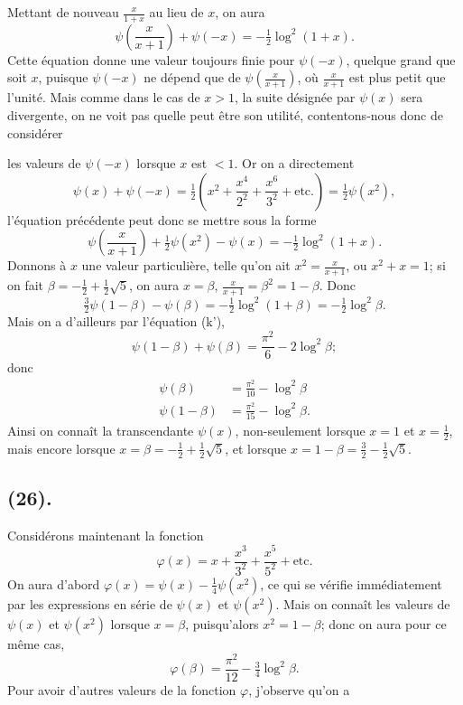 \documentclass{article}
\begin{document}
Mettant de nouveau $\frac{x}{1+x}$ au lieu de $x$, on aura
\[ \psi\left(\frac{x}{x+1}\right)+\psi(-x)=-\tfrac{1}{2}\log^{2}(1+x). \]
Cette équation donne une valeur toujours finie pour $\psi(-x)$, quelque grand que soit $x$, puisque $\psi(-x)$ ne dépend que de $\psi\left(\frac{x}{x+1}\right)$, où $\frac{x}{x+1}$ est plus petit que l'unité. Mais comme dans le cas de $x>1$, la suite désignée par $\psi(x)$ sera divergente, on ne voit pas quelle peut être son utilité, contentons-nous donc de considérer

les valeurs de $\psi(-x)$ lorsque $x$ est ${}<1$. Or on a directement
\[ \psi(x)+\psi(-x)=\tfrac{1}{2}\left(x^{2}+\frac{x^{4}}{2^{2}}+\frac{x^{6}}{3^{2}}+\text{etc.}\right)=\tfrac{1}{2}\psi(x^{2}), \]
l'équation précédente peut donc se mettre sous la forme
\[ \psi\left(\frac{x}{x+1}\right)+\tfrac{1}{2}\psi(x^{2})-\psi(x)=-\tfrac{1}{2}\log^{2}(1+x). \]
Donnons à $x$ une valeur particulière, telle qu'on ait $x^{2}=\frac{x}{x+1}$, ou $x^{2}+x=1$; si on fait $\beta=-\frac{1}{2}+\frac{1}{2}\sqrt{5}$, on aura $x=\beta$, $\frac{x}{x+1}=\beta^{2}=1-\beta$. Donc
\[ \tfrac{3}{2}\psi(1-\beta)-\psi(\beta)=-\tfrac{1}{2}\log^{2}(1+\beta)=-\tfrac{1}{2}\log^{2}\beta. \]
Mais on a d'ailleurs par l'équation (k'),
\[ \psi(1-\beta)+\psi(\beta)=\frac{\pi^{2}}{6}-2\log^{2}\beta; \]
donc
\[ \begin{aligned} \psi(\beta)&=\frac{\pi^{2}}{10}-\log^{2}\beta\\ \psi(1-\beta)&=\frac{\pi^{2}}{15}-\log^{2}\beta. \end{aligned} \]
Ainsi on connaît la transcendante $\psi(x)$, non-seulement lorsque $x=1$ et $x=\frac{1}{2}$, mais encore lorsque $x=\beta=-\frac{1}{2}+\frac{1}{2}\sqrt{5}$, et lorsque $x=1-\beta=\frac{3}{2}-\frac{1}{2}\sqrt{5}$.

\subsection*{(26).}

Considérons maintenant la fonction
\[ \varphi(x)=x+\frac{x^{3}}{3^{2}}+\frac{x^{5}}{5^{2}}+\text{etc.} \]
On aura d'abord $\varphi(x)=\psi(x)-\frac{1}{4}\psi(x^{2})$, ce qui se vérifie immédiatement par les expressions en série de $\psi(x)$ et $\psi(x^{2})$. Mais on connaît les valeurs de $\psi(x)$ et $\psi(x^{2})$ lorsque $x=\beta$, puisqu'alors $x^{2}=1-\beta$; donc on aura pour ce même cas,
\[ \varphi(\beta)=\frac{\pi^{2}}{12}-\tfrac{3}{4}\log^{2}\beta. \]
Pour avoir d'autres valeurs de la fonction $\varphi$, j'observe qu'on a
\end{document}
